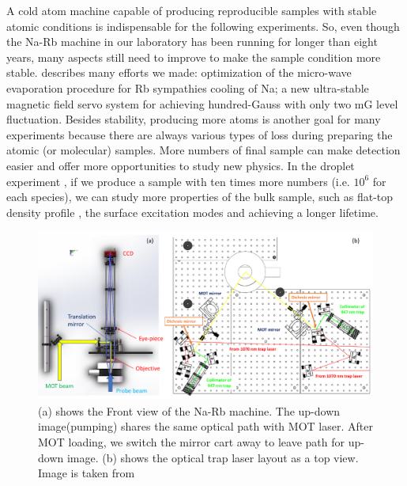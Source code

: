 A cold atom machine capable of producing reproducible samples with stable atomic conditions is indispensable for the following experiments. So, even though the Na-Rb machine in our laboratory has been running for longer than eight years, many aspects still need to improve to make the sample condition more stable. \cite{LiLintao2021} describes many efforts we made: optimization of the micro-wave evaporation procedure for Rb sympathies cooling of Na; a new ultra-stable magnetic field servo system for achieving hundred-Gauss with only two mG level fluctuation. Besides stability, producing more atoms is another goal for many experiments because there are always various types of loss during preparing the atomic (or molecular) samples. More numbers of final sample can make detection easier and offer more opportunities to study new physics. In the droplet experiment \cite{guo2021leehuangyang}, if we produce a sample with ten times more numbers (i.e. $10^6$ for each species), we can study more properties of the bulk sample, such as flat-top density profile \cite{petrov2015}, the surface excitation modes \cite{petrov2015} and achieving a longer lifetime.

\begin{figure}[htb]
\begin{center}
\includegraphics[width = \linewidth]{figures/Apparatus_overall.pdf}
\end{center}
\caption[Front and top view of overall Na-Rb machine]{(a) shows the Front view of the Na-Rb machine. The up-down image(pumping) shares the same optical path with MOT laser. After MOT loading, we switch the mirror cart away to leave path for up-down image. (b) shows the optical trap laser layout as a top view. Image is taken from \cite{LiLintao2021}}
\label{Apparatus_overall}
\end{figure}

